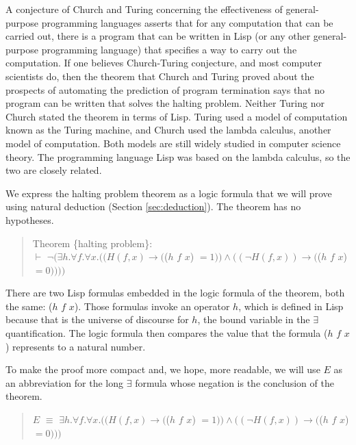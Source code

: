 \label{church-turing-hypothesis}
A conjecture of Church and Turing
concerning the effectiveness of general-purpose programming languages
asserts that for any computation that can be carried out, there is a program
that can be written in Lisp (or any other general-purpose programming language)
that specifies a way to carry out the computation.
If one believes Church-Turing conjecture, and most computer scientists do,
then the theorem that Church and Turing proved about the prospects of
automating the prediction of program termination
says that no program can be written that solves the halting problem.
Neither Turing nor Church stated the theorem in terms of Lisp.
Turing used a model of computation known as the Turing machine, and
Church used the lambda calculus, another model of computation.
Both models are still widely studied in computer science theory.
The programming language Lisp
was based on the lambda calculus, so the two are closely related.

We express the halting problem theorem as a logic formula that we will prove
using natural deduction (Section \ref{sec:deduction}).
The theorem has no hypotheses.
\begin{quote}
Theorem \{halting problem\}:\\
$\vdash$ $\neg(\exists h. \forall f. \forall x.
((H(f, x) \rightarrow ($($h$ $f$ $x$) $ = 1)) \wedge ((\neg H(f, x)) \rightarrow ($($h$ $f$ $x$) $= 0))))$
\end{quote}

There are two Lisp formulas embedded in
the logic formula of the theorem, both the same:
($h$ $f$ $x$).
Those formulas invoke an operator $h$, which is defined in Lisp because that is the universe
of discourse for $h$, the bound variable in the $\exists$ quantification.
The logic formula then compares the value that
the formula ($h$ $f$ $x$) represents to a natural number.

To make the proof more compact and, we hope, more readable,
we will use $E$ as an abbreviation for the
long $\exists$ formula whose negation is the conclusion of the theorem.
\begin{quote}
$E$ $\equiv$ $\exists h. \forall f. \forall x.
((H(f, x) \rightarrow ($($h$ $f$ $x$) $ = 1)) \wedge ((\neg H(f, x)) \rightarrow ($($h$ $f$ $x$) $= 0)))$
\end{quote}


